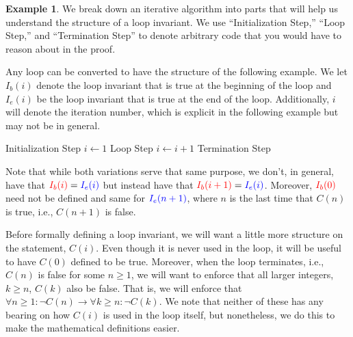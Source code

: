 \documentclass{article}
\newcommand{\ra}{\rightarrow}
\theoremstyle{plain}
\theoremstyle{definition}
\newtheorem{example}{Example}
\begin{document}
\begin{example}\label{ex_loop_inv_b_e}
    We break down an iterative algorithm into parts that will help us understand the structure of a loop invariant. We use ``Initialization Step,'' ``Loop Step,'' and ``Termination Step'' to denote arbitrary code that you would have to reason about in the proof.
    
    Any loop can be converted to have the structure of the following example. We let {\color{red}\(I_b(i)\)} denote the loop invariant that is true at the beginning of the loop and {\color{blue}\(I_e(i)\)} be the loop invariant that is true at the end of the loop. Additionally, \(i\) will denote the iteration number, which is explicit in the following example but may not be in general.
    \begin{center}
    \begin{minipage}{.5\linewidth}
    \begin{algorithmic}[1]
        \State Initialization Step
        \State \(i \leftarrow 1\)
            \State Loop Step
            \State \(i \leftarrow i + 1\)
        \EndWhile
        \State Termination Step
    \end{algorithmic}
    \end{minipage}
    \end{center}
Note that while both variations serve that same purpose, we don't, in general, have that \({\color{red}I_b(i)} = {\color{blue}I_e(i)}\) but instead have that \({\color{red}I_b(i+1)} = {\color{blue}I_e(i)}\). Moreover, \(\color{red}I_b(0)\) need not be defined and same for \(\color{blue}I_e(n+1)\), where \(n\) is the last time that \(C(n)\) is true, i.e., \(C(n+1)\) is false. 
\end{example}

Before formally defining a loop invariant, we will want a little more structure on the statement, \(C(i)\). Even though it is never used in the loop, it will be useful to have \(C(0)\) defined to be true. Moreover, when the loop terminates, i.e., \(C(n)\) is false for some \(n \geq 1\), we will want to enforce that all larger integers, \(k \geq n\), \(C(k)\) also be false. That is, we will enforce that \(\forall n \geq 1 : \lnot C(n) \ra \forall k \geq n : \lnot C(k)\). We note that neither of these has any bearing on how \(C(i)\) is used in the loop itself, but nonetheless, we do this to make the mathematical definitions easier.
\end{document}
